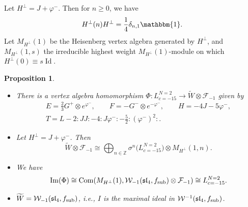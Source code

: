 \documentclass[pdftex]{sigma}
\numberwithin{equation}{section}
\newcommand{\F}{\mathcal F}
\newcommand{\W}{\mathcal W}
\newtheorem{Proposition}[Theorem]{Proposition}
\begin{document}
Let $H^{\perp} = J + \varphi^-$. Then for $n \ge 0$, we have
\[
H^{\perp}(n) H^{\perp} = \frac{1}{4} \delta_{n,1}\mathbbm{1}.
\]
Let $M_{H^{\perp}} (1)$ be the Heisenberg vertex algebra generated by $H^{\perp}$, and $M_{H^{\perp}} (1, s)$ the irreducible highest weight $M_{H^{\perp}} (1)$-module on which
$H^{\perp}(0) \equiv s \operatorname{Id}$.

\begin{Proposition} \label{ulaganje-1}\qquad
\begin{itemize}\itemsep=0pt
\item[$(1)$]There is a vertex algebra homomorphism $\Phi\colon L^{N=2}_{c=-15} \rightarrow \widetilde W \otimes \F_{-1}$ given by
	\begin{gather*}
		E = \frac{2}{3} G^+ \otimes e^{\varphi^-}, \qquad
		F = - G^- \otimes e^{-\varphi^-},\qquad
		H = - 4 J - 5 \varphi^-, \\
		T = L- 2{:}J J {:}-4{:}J\varphi^-{:} -\frac{5}{2}{:}(\varphi^-)^2{:}.
	\end{gather*}
	\item[$(2)$]
	Let $H^{\perp} = J + \varphi^-$. Then
\[
 \widetilde W \otimes \F_{-1} \cong \bigoplus_{n \in {\mathbb{Z}}} \sigma^n \bigl(L^{N=2}_{c=-15}\bigr) \otimes M_{H^\perp} (1, n).
 \]
	\item[$(3)$] We have
\[
\operatorname{Im} (\Phi) \cong \operatorname{Com} (M_{H^{\perp}} (1), \mathcal{W}_{-1}(\mathfrak{sl}_4, f_{\rm sub}) \otimes \F_{-1}) \cong L^{N=2}_{c=-15} .
\]
\item[$(4)$] $\widetilde W = \W_{-1} (\mathfrak{sl}_4, f_{\rm sub})$, i.e., $I$ is the maximal ideal in $\W^{-1}(\mathfrak{sl}_4, f_{\rm sub})$.
\end{itemize}
	
\end{Proposition}
\end{document}
